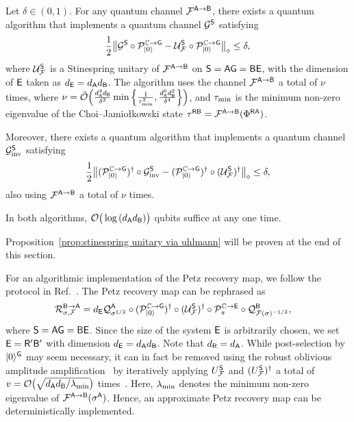 \begin{proposition}
\label{prop:stinespring unitary via uhlmann}
Let $\delta \in (0, 1)$. For any quantum channel ${\mathcal{F}}^{{\mathsf{A}}\rightarrow{\mathsf{B}}}$, there exists a quantum algorithm that implements a quantum channel ${\mathcal{G}}^{\mathsf{S}}$ satisfying 
\begin{align}
    \frac{1}{2}\big\|{\mathcal{G}}^{\mathsf{S}} \circ {\mathcal{P}}_{|0\rangle}^{\mathbb{C}\rightarrow{\mathsf{G}}} - {\mathcal{U}}_{\mathcal{F}}^{\mathsf{S}} \circ {\mathcal{P}}_{|0\rangle}^{\mathbb{C}\rightarrow{\mathsf{G}}}\big\|_\diamond \leq \delta, 
\end{align}
where ${\mathcal{U}}_{\mathcal{F}}^{\mathsf{S}}$ is a Stinespring unitary of ${\mathcal{F}}^{{\mathsf{A}}\rightarrow{\mathsf{B}}}$ on ${\mathsf{S}} = {\mathsf{A}}{\mathsf{G}} = {\mathsf{B}}{\mathsf{E}}$, with the dimension of ${\mathsf{E}}$ taken as $d_{\mathsf{E}} = d_{\mathsf{A}} d_{\mathsf{B}}$.
The algorithm uses the channel ${\mathcal{F}}^{{\mathsf{A}} \rightarrow {\mathsf{B}}}$ a total of $\nu$ times, where $\nu = \tilde{{\mathcal{O}}}\Big(\frac{d_{\mathsf{A}}^4 d_{\mathsf{B}}}{\delta^2}\min\Big\{\frac{1}{\tau_{\rm min}^2}, \frac{d_{\mathsf{A}}^6d_{\mathsf{B}}^2}{\delta^4}\Big\}\Big)$, and $\tau_{\rm min}$ is the minimum non-zero eigenvalue of the Choi--Jamio\l kowski state $\tau^{{\mathsf{R}}{\mathsf{B}}} = {\mathcal{F}}^{{\mathsf{A}}\rightarrow{\mathsf{B}}}(\Phi^{{\mathsf{R}}{\mathsf{A}}})$.

Moreover, there exists a quantum algorithm that implements a quantum channel ${\mathcal{G}}_{\rm inv}^{\mathsf{S}}$ satisfying 
\begin{align}
    \frac{1}{2}\big\|({\mathcal{P}}_{|0\rangle}^{\mathbb{C}\rightarrow{\mathsf{G}}})^\dag\circ{\mathcal{G}}_{\rm inv}^{\mathsf{S}} - ({\mathcal{P}}_{|0\rangle}^{\mathbb{C}\rightarrow{\mathsf{G}}})^\dag\circ({\mathcal{U}}_{\mathcal{F}}^{\mathsf{S}})^\dag\big\|_\diamond \leq \delta,
\end{align}
also using ${\mathcal{F}}^{{\mathsf{A}}\rightarrow{\mathsf{B}}}$ a total of $\nu$ times.

In both algorithms, ${\mathcal{O}}\big(\log{(d_{\mathsf{A}}d_{\mathsf{B}})}\big)$ qubits suffice at any one time.

\end{proposition}


Proposition~\ref{prop:stinespring unitary via uhlmann} will be proven at the end of this section.





For an algorithmic implementation of the Petz recovery map, we follow the protocol in Ref.~\cite{gilyen2022petzmap}.
The Petz recovery map can be rephrased as
\begin{align}
\label{eq:petz exp form rephrase}
    {\mathcal{R}}_{\sigma, {\mathcal{F}}}^{{\mathsf{B}} \rightarrow {\mathsf{A}}}
    &= d_{\mathsf{E}}{\mathcal{Q}}_{\sigma^{1/2}}^{\mathsf{A}}\circ({\mathcal{P}}_{|0\rangle}^{\mathbb{C}\rightarrow{\mathsf{G}}})^\dag \circ({\mathcal{U}}_{\mathcal{F}}^{{\mathsf{S}}})^\dag \circ{\mathcal{P}}_\pi^{\mathbb{C}\rightarrow{\mathsf{E}}}\circ{\mathcal{Q}}_{{\mathcal{F}}(\sigma)^{-1/2}}^{\mathsf{B}},
\end{align}
where ${\mathsf{S}} = {\mathsf{A}}{\mathsf{G}} = {\mathsf{B}}{\mathsf{E}}$.
Since the size of the system ${\mathsf{E}}$ is arbitrarily chosen, we set ${\mathsf{E}} = {\mathsf{R}}'{\mathsf{B}}'$ with dimension $d_{\mathsf{E}} = d_{\mathsf{A}} d_{\mathsf{B}}$. Note that $d_{\mathsf{R}} = d_{\mathsf{A}}$.
While post-selection by $|0\rangle^{\mathsf{G}}$ may seem necessary, it can in fact be removed using the robust oblivious amplitude amplification~\cite{gilyen2019qsvt, Gilyn2019thesis} by iteratively applying $U_{\mathcal{F}}^{\mathsf{S}}$ and $(U_{\mathcal{F}}^{\mathsf{S}})^\dag$ a total of $v = {\mathcal{O}}\big(\sqrt{d_{\mathsf{A}} d_{\mathsf{B}}/\lambda_{\rm min}}\big)$ times~\cite{gilyen2022petzmap}.
Here, $\lambda_{\rm min}$ denotes the minimum non-zero eigenvalue of ${\mathcal{F}}^{{\mathsf{A}}\rightarrow{\mathsf{B}}}(\sigma^{\mathsf{A}})$.
Hence, an approximate Petz recovery map can be deterministically implemented.




